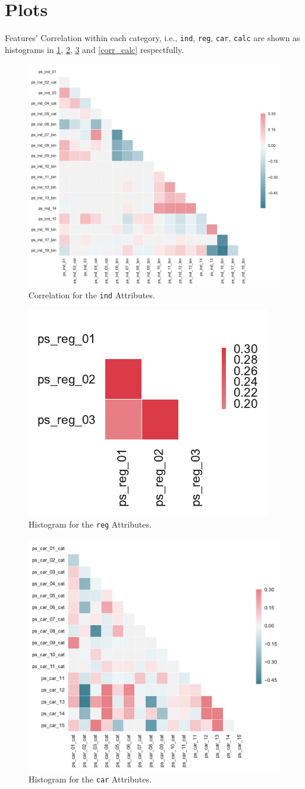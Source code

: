 \documentclass{standalone}
\begin{document}
\appendix

\section{Plots}

Features' Correlation within each category, i.e., \lstinline{ind}, \lstinline{reg}, \lstinline{car}, \lstinline{calc} are shown as histograms in \cref{corr_ind}, \cref{corr_reg}, \cref{corr_car} and \cref{corr_calc} respectfully.

\begin{figure}[!b]
\centering
\includegraphics[width=.5\textwidth]{fig/corr_ind_col.pdf}
\caption{Correlation for the \lstinline{ind} Attributes.}
\label{corr_ind}
\end{figure}

\begin{figure}[!bt]
\centering
\includegraphics[width=.2\textwidth]{fig/corr_reg_col.pdf}
\caption{Histogram for the \lstinline{reg} Attributes.}
\label{corr_reg}
\end{figure}

\begin{figure}[!bt]
\centering
\includegraphics[width=.5\textwidth]{fig/corr_car_col.pdf}
\caption{Histogram for the \lstinline{car} Attributes.}
\label{corr_car}
\end{figure}
\end{document}
